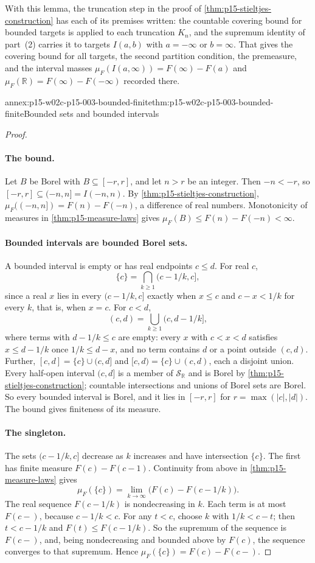 With this lemma, the truncation step in the proof of
\cref{thm:p15-stieltjes-construction} has each of its premises written:
the countable covering bound for bounded targets is applied to each
truncation \(K_n\), and the supremum identity of part~(2) carries it to
targets \(I(a,b)\) with \(a=-\infty\) or \(b=\infty\). That gives the
covering bound for all targets, the second partition condition, the
premeasure, and the interval masses \(\mu_F(I(a,\infty))=F(\infty)-F(a)\)
and \(\mu_F(\mathbb R)=F(\infty)-F(-\infty)\) recorded there.

\begin{annexitem}{annex:p15-w02c-p15-003-bounded-finite}{thm:p15-w02c-p15-003-bounded-finite}{Bounded sets and bounded intervals}
\begin{proof}
\paragraph{The bound.}
Let \(B\) be Borel with \(B\subseteq[-r,r]\), and let \(n>r\) be an
integer. Then \(-n<-r\), so \([-r,r]\subseteq(-n,n]=I(-n,n)\). By
\cref{thm:p15-stieltjes-construction},
\(\mu_F((-n,n])=F(n)-F(-n)\), a difference of real numbers.
Monotonicity of measures in \cref{thm:p15-measure-laws} gives
\(\mu_F(B)\leq F(n)-F(-n)<\infty\).

\paragraph{Bounded intervals are bounded Borel sets.}
A bounded interval is empty or has real endpoints \(c\leq d\). For real
\(c\),
\[
 \{c\}=\bigcap_{k\geq1}(c-1/k,c],
\]
since a real \(x\) lies in every \((c-1/k,c]\) exactly when
\(x\leq c\) and \(c-x<1/k\) for every \(k\), that is, when \(x=c\).
For \(c<d\),
\[
 (c,d)=\bigcup_{k\geq1}(c,d-1/k],
\]
where terms with \(d-1/k\leq c\) are empty: every \(x\) with
\(c<x<d\) satisfies \(x\leq d-1/k\) once \(1/k\leq d-x\), and no term
contains \(d\) or a point outside \((c,d)\). Further,
\([c,d]=\{c\}\cup(c,d]\) and \([c,d)=\{c\}\cup(c,d)\), each a disjoint
union. Every half-open interval \((c,d]\) is a member of
\(\mathcal S_{\mathbb R}\) and is Borel by
\cref{thm:p15-stieltjes-construction}; countable intersections and unions
of Borel sets are Borel. So every bounded interval is Borel, and it lies in
\([-r,r]\) for \(r=\max(|c|,|d|)\). The bound gives finiteness of its
measure.

\paragraph{The singleton.}
The sets \((c-1/k,c]\) decrease as \(k\) increases and have intersection
\(\{c\}\). The first has finite measure \(F(c)-F(c-1)\). Continuity from
above in \cref{thm:p15-measure-laws} gives
\[
 \mu_F(\{c\})=\lim_{k\to\infty}\bigl(F(c)-F(c-1/k)\bigr).
\]
The real sequence \(F(c-1/k)\) is nondecreasing in \(k\). Each term is at
most \(F(c-)\), because \(c-1/k<c\). For any \(t<c\), choose \(k\) with
\(1/k<c-t\); then \(t<c-1/k\) and \(F(t)\leq F(c-1/k)\). So the
supremum of the sequence is \(F(c-)\), and, being nondecreasing and
bounded above by \(F(c)\), the sequence converges to that supremum. Hence
\(\mu_F(\{c\})=F(c)-F(c-)\).


\end{proof}
\end{annexitem}
